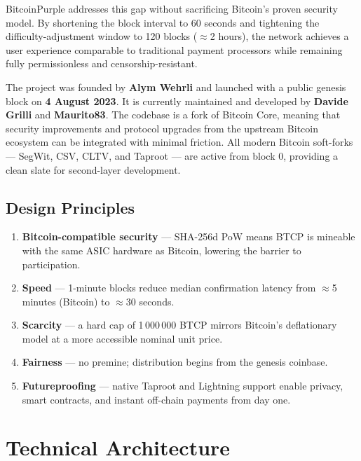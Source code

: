 \documentclass[12pt, a4paper]{article}
\begin{document}
BitcoinPurple addresses this gap without sacrificing Bitcoin's proven security
model.  By shortening the block interval to 60 seconds and tightening the
difficulty-adjustment window to 120 blocks (\(\approx\)2 hours), the network
achieves a user experience comparable to traditional payment processors while
remaining fully permissionless and censorship-resistant.

The project was founded by \textbf{Alym Wehrli} and launched with a public
genesis block on \textbf{4 August 2023}.  It is currently maintained and
developed by \textbf{Davide Grilli} and \textbf{Maurito83}.  The codebase
is a fork of Bitcoin Core, meaning that security improvements and protocol
upgrades from the upstream Bitcoin ecosystem can be integrated with minimal
friction.  All modern Bitcoin soft-forks — SegWit, CSV, CLTV, and Taproot — are
active from block 0, providing a clean slate for second-layer development.

\subsection{Design Principles}

\begin{enumerate}[leftmargin=*, label=\textbf{\arabic*.}]
  \item \textbf{Bitcoin-compatible security} — SHA-256d PoW means BTCP is
        mineable with the same ASIC hardware as Bitcoin, lowering the barrier
        to participation.
  \item \textbf{Speed} — 1-minute blocks reduce median confirmation latency
        from \(\approx\)5 minutes (Bitcoin) to \(\approx\)30 seconds.
  \item \textbf{Scarcity} — a hard cap of 1\,000\,000 BTCP mirrors Bitcoin's
        deflationary model at a more accessible nominal unit price.
  \item \textbf{Fairness} — no premine; distribution begins from the genesis
        coinbase.
  \item \textbf{Futureproofing} — native Taproot and Lightning support enable
        privacy, smart contracts, and instant off-chain payments from day one.
\end{enumerate}

\newpage
\section{Technical Architecture}
\end{document}
